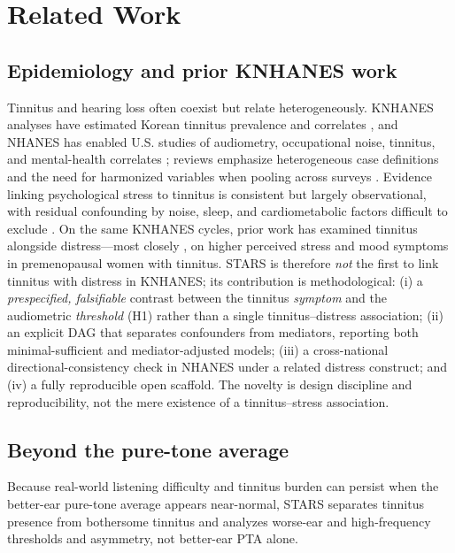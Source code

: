 \section{Related Work}
\subsection{Epidemiology and prior KNHANES work}
Tinnitus and hearing loss often coexist but relate heterogeneously. KNHANES
analyses have estimated Korean tinnitus prevalence and correlates
\citep{park2014tinnitus,joo2015hrqol}, and NHANES has enabled U.S. studies of
audiometry, occupational noise, tinnitus, and mental-health correlates
\citep{hoffman2017declining,chakrabarty2024depression,mahboubi2013noise}; reviews
emphasize heterogeneous case definitions and the need for harmonized variables
when pooling across surveys \citep{mccormack2016review}. Evidence linking
psychological stress to tinnitus is consistent but largely observational, with
residual confounding by noise, sleep, and cardiometabolic factors difficult to
exclude \citep{baigi2011tinnitus}. On the same KNHANES cycles, prior work has
examined tinnitus alongside distress---most closely \citet{lee2018tinnitus}, on
higher perceived stress and mood symptoms in premenopausal women with tinnitus.
STARS is therefore \emph{not} the first to link tinnitus with distress in KNHANES;
its contribution is methodological: (i) a \emph{prespecified, falsifiable} contrast
between the tinnitus \emph{symptom} and the audiometric \emph{threshold} (H1)
rather than a single tinnitus--distress association; (ii) an explicit DAG that
separates confounders from mediators, reporting both minimal-sufficient and
mediator-adjusted models; (iii) a cross-national directional-consistency check in
NHANES under a related distress construct; and (iv) a fully reproducible open
scaffold. The novelty is design discipline and reproducibility, not the mere
existence of a tinnitus--stress association.

\subsection{Beyond the pure-tone average}
Because real-world listening difficulty and tinnitus burden can persist when the
better-ear pure-tone average appears near-normal, STARS separates tinnitus
presence from bothersome tinnitus and analyzes worse-ear and high-frequency
thresholds and asymmetry, not better-ear PTA alone.


